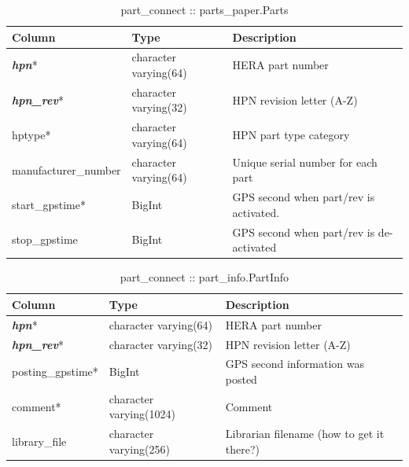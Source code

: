 \documentclass{article}
\begin{document}
\begin{table}[h]
\centering
\caption{part\_connect :: parts\_paper.Parts}
\begin{tabular}{| l | l | l |} \hline
{\bf Column} & {\bf Type} & {\bf Description} \\ \hline
{\bf \em hpn}* & character varying(64) & HERA part number \\ \hline
{\bf \em hpn\_rev}* & character varying(32) & HPN revision letter (A-Z) \\ \hline
hptype*  &  character varying(64) & HPN part type category \\ \hline
manufacturer\_number & character varying(64) & Unique serial number for each part \\ \hline
start\_gpstime* & BigInt & GPS second when part/rev is activated. \\ \hline
stop\_gpstime & BigInt & GPS second when part/rev is de-activated \\ \hline
\end{tabular}
\end{table}

\begin{table}[h]
\centering
\caption{part\_connect :: part\_info.PartInfo}
\begin{tabular}{| l | l | l |} \hline
{\bf Column} & {\bf Type} & {\bf Description} \\ \hline
{\bf \em hpn}* & character varying(64) & HERA part number \\ \hline
{\bf \em hpn\_rev}* & character varying(32) & HPN revision letter (A-Z) \\ \hline
posting\_gpstime* & BigInt & GPS second information was posted \\ \hline
comment* &  character varying(1024) & Comment \\ \hline
library\_file & character varying(256) &  Librarian filename (how to get it there?) \\ \hline
\end{tabular}
\end{table}
\end{document}
